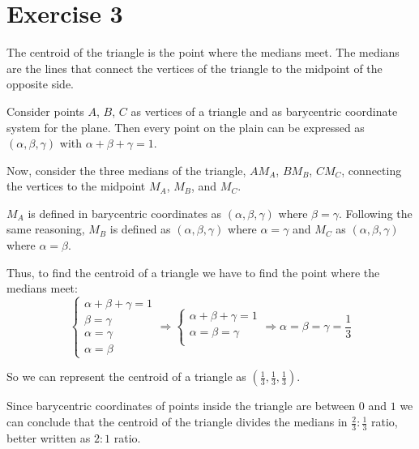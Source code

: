 \documentclass[tikz,14pt,fleqn]{article}
\begin{document}
\newpage

\section{Exercise 3}
The centroid of the triangle is the point where the medians meet.
The medians are the lines that connect the vertices of the triangle to the midpoint of the opposite side.

Consider points $A$, $B$, $C$ as vertices of a triangle and as barycentric coordinate system for the plane.
Then every point on the plain can be expressed as $\left( \alpha, \beta, \gamma \right)$ with $\alpha+\beta+\gamma=1$.

Now, consider the three medians of the triangle, $AM_A$, $BM_B$, $CM_C$, connecting the vertices to the midpoint $M_A$, $M_B$, and $M_C$.

$M_A$ is defined in barycentric coordinates as $\left( \alpha, \beta, \gamma \right)$ where $\beta = \gamma$.
Following the same reasoning, $M_B$ is defined as $\left( \alpha, \beta, \gamma \right)$ where $\alpha = \gamma$ and $M_C$ as $\left( \alpha, \beta, \gamma \right)$ where $\alpha = \beta$.

Thus, to find the centroid of a triangle we have to find the point where the medians meet:
\begin{equation}
   \begin{cases}
      \alpha + \beta + \gamma = 1 \\
      \beta = \gamma \\
      \alpha = \gamma \\
      \alpha = \beta
   \end{cases}
   \Rightarrow
   \begin{cases}
      \alpha + \beta + \gamma = 1 \\
      \alpha = \beta = \gamma \\
   \end{cases}
   \Rightarrow
   \alpha = \beta = \gamma = \frac{1}{3}
\end{equation}

So we can represent the centroid of a triangle as $\left({\frac{1}{3}}, {\frac{1}{3}}, {\frac{1}{3}} \right)$.


Since barycentric coordinates of points inside the triangle are between $0$ and $1$ 
we can conclude that the centroid of the triangle divides the medians in $\frac{2}{3}:\frac{1}{3}$ ratio, better written as $2:1$ ratio.
\end{document}
